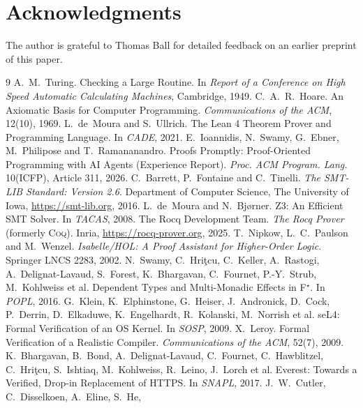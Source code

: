 \documentclass[11pt,letterpaper]{article}
\begin{document}
\section*{Acknowledgments}

The author is grateful to Thomas Ball for detailed feedback on an earlier
preprint of this paper.

\begin{thebibliography}{9}
 A.~M.~Turing. Checking a Large Routine. In \emph{Report of
  a Conference on High Speed Automatic Calculating Machines}, Cambridge, 1949.
 C.~A.~R.~Hoare. An Axiomatic Basis for Computer
  Programming. \emph{Communications of the ACM}, 12(10), 1969.
 L.~de~Moura and S.~Ullrich. The Lean 4 Theorem Prover
  and Programming Language. In \emph{CADE}, 2021.
 E.~Ioannidis, N.~Swamy, G.~Ebner,
  M.~Philipose and T.~Ramananandro. Proofs Promptly: Proof-Oriented Programming
  with AI Agents (Experience Report). \emph{Proc. ACM Program. Lang.} 10(ICFP),
  Article 311, 2026.
 C.~Barrett, P.~Fontaine and C.~Tinelli. \emph{The
  SMT-LIB Standard: Version 2.6}. Department of Computer Science, The University
  of Iowa, \url{https://smt-lib.org}, 2016.
 L.~de~Moura and N.~Bj{\o}rner. Z3: An Efficient SMT
  Solver. In \emph{TACAS}, 2008.
 The Rocq Development Team. \emph{The Rocq Prover} (formerly
  \textsc{Coq}). Inria, \url{https://rocq-prover.org}, 2025.
 T.~Nipkow, L.~C.~Paulson and M.~Wenzel.
  \emph{Isabelle/HOL: A Proof Assistant for Higher-Order Logic}. Springer LNCS
  2283, 2002.
 N.~Swamy, C.~Hri\c{t}cu, C.~Keller, A.~Rastogi,
  A.~Delignat-Lavaud, S.~Forest, K.~Bhargavan, C.~Fournet, P.-Y.~Strub,
  M.~Kohlweiss et al. Dependent Types and Multi-Monadic
  Effects in F$^\star$. In \emph{POPL}, 2016.
 G.~Klein, K.~Elphinstone, G.~Heiser, J.~Andronick,
  D.~Cock, P.~Derrin, D.~Elkaduwe, K.~Engelhardt, R.~Kolanski,
  M.~Norrish et al. seL4: Formal Verification of an OS
  Kernel. In \emph{SOSP}, 2009.
 X.~Leroy. Formal Verification of a Realistic
  Compiler. \emph{Communications of the ACM}, 52(7), 2009.
 K.~Bhargavan, B.~Bond, A.~Delignat-Lavaud,
  C.~Fournet, C.~Hawblitzel, C.~Hri\c{t}cu, S.~Ishtiaq, M.~Kohlweiss, R.~Leino,
  J.~Lorch et al. Everest: Towards a Verified,
  Drop-in Replacement of HTTPS. In \emph{SNAPL}, 2017.
 J.~W.~Cutler, C.~Disselkoen, A.~Eline, S.~He,

\end{thebibliography}
\end{document}
